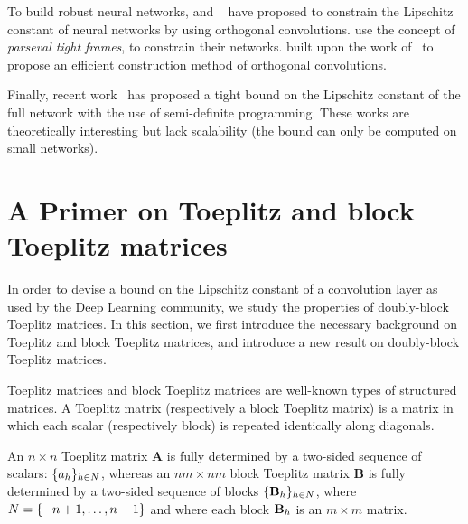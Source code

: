 To build robust neural networks, \cite{cisse2017parseval} and ~\cite{NIPS2019_9673} have proposed to constrain the Lipschitz constant of neural networks by using orthogonal convolutions.
\cite{cisse2017parseval} use the concept of {\em parseval tight frames}, to constrain their networks.
\cite{NIPS2019_9673} built upon the work of~\cite{cisse2017parseval} to propose an efficient construction method of orthogonal convolutions.  

Finally, recent work~\cite{NIPS2019_9319,latorre2020lipschitz} has proposed a tight bound on the Lipschitz constant of the full network with the use of semi-definite programming.
These works are theoretically interesting but lack scalability (\ie the bound can only be computed on small networks).


\section{A Primer on Toeplitz and block Toeplitz matrices}
\label{sec:primer_toeplitz_matrix}

In order to devise a bound on the Lipschitz constant of a convolution layer as used by the Deep Learning community, we study the properties of doubly-block Toeplitz matrices.
In this section, we first introduce the necessary background on Toeplitz and block Toeplitz matrices, and introduce a new result on doubly-block Toeplitz matrices.

Toeplitz matrices and block Toeplitz matrices are well-known types of structured matrices.
A Toeplitz matrix  (respectively a block Toeplitz matrix) is a matrix in which each scalar (respectively block) is repeated identically along diagonals.

An $n\times n$ Toeplitz matrix $\mathbf A$ is fully determined by a two-sided sequence of scalars: $\{a_h\}_{h \in N}$, whereas an $nm\times nm$ block Toeplitz matrix $\mathbf B$ is fully determined by a two-sided sequence of blocks $\{\mathbf B_h\}_{h \in N}$, where $N = \{-n+1,\dots, n-1 \}$ and where each block $\mathbf B_h$ is an $m \times m$ matrix.  

